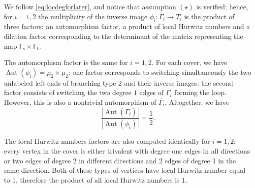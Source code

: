 \documentclass[11pt,reqno]{amsart}
\theoremstyle{definition}
\DeclareMathOperator{\Aut}{\mathrm Aut}
\newcommand{\Ft}{\mathsf{F_t}}
\newcommand{\Fs}{\mathsf{F_s}}
\begin{document}
We follow \eqref{eq:locdegforlater}, and notice that assumption $(\star)$ is verified; hence, for $i = 1,2$ the multiplicity of the inverse image $\phi_i:\Gamma_i\to T_i$ is the product of three factors: an automorphism factor, a product of local Hurwitz numbers and a dilation factor corresponding to the determinant of  the matrix representing the map $\Fs\times\Ft$.

The automorphism factor is the same for $i = 1,2$.
For each cover, we have $\Aut(\phi_i) = \mu_2\times \mu_2$: one factor corresponds to switching simultaneously the two unlabeled left ends of branching type $2$ and their inverse images; the second factor consists of switching the two degree $1$ edges of $\Gamma_i$ forming the loop. However, this is also a nontrivial automorphism of $\overline{\Gamma_i}$. Altogether, we have
\begin{equation}
    \frac{|\Aut(\overline{\Gamma_i})|}{|\Aut(\phi_i)|} = \frac{1}{2}.
\end{equation}
 
 
The local Hurwitz numbers factors are also computed identically for $i = 1,2$:  every vertex in the cover is either trivalent with degree one edges in all directions or two edges of degree 2 in different directions and 2 edges of degree 1 in the same direction. Both of these types of vertices have local Hurwitz number equal to 1, therefore the product of all local Hurwitz numbers is 1. 
\end{document}
